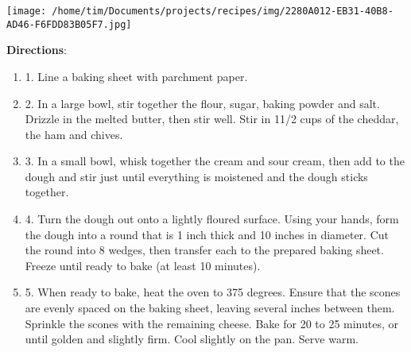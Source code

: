 \documentclass[11pt, twoside, openany]{book}
\begin{document}
\begin{minipage}[t]{0.2\linewidth}
\centering \strut\vspace*{-\baselineskip}\newline
\texttt{[image: /home/tim/Documents/projects/recipes/img/2280A012-EB31-40B8-AD46-F6FDD83B05F7.jpg]}\\
\end{minipage}\vspace{3mm}
\textbf{Directions}:
\vspace{-3mm}\begin{enumerate}\setlength\itemsep{-1mm}
\item 1. Line a baking sheet with parchment paper.
\item 2. In a large bowl, stir together the flour, sugar, baking powder and salt. Drizzle in the melted butter, then stir well. Stir in 11/2 cups of the cheddar, the ham and chives.
\item 3. In a small bowl, whisk together the cream and sour cream, then add to the dough and stir just until everything is moistened and the dough sticks together.
\item 4. Turn the dough out onto a lightly floured surface. Using your hands, form the dough into a round that is 1 inch thick and 10 inches in diameter. Cut the round into 8 wedges, then transfer each to the prepared baking sheet. Freeze until ready to bake (at least 10 minutes).
\item 5. When ready to bake, heat the oven to 375 degrees. Ensure that the scones are evenly spaced on the baking sheet, leaving several inches between them. Sprinkle the scones with the remaining cheese. Bake for 20 to 25 minutes, or until golden and slightly firm. Cool slightly on the pan. Serve warm.
\end{enumerate}
 \label{best-coconut-chocolate-cake-recipe}\hfill\textit{}\\
\end{document}
